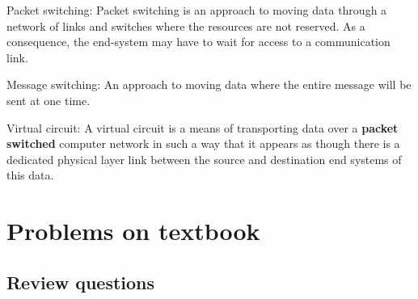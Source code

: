 \documentclass[]{article}
\begin{document}
\begin{enumerate}
\begin{adjustwidth}{0.1cm}{0cm}
		\qquad Packet switching: Packet switching is an approach to moving data through a network of links and switches where the resources are not reserved. As a consequence, the end-system may have to wait for access to a communication link.
		
		\qquad Message switching: An approach to moving data where the entire message will be sent at one time.
		
		\qquad Virtual circuit: A virtual circuit is a means of transporting data over a \textbf{packet switched} computer network in such a way that it appears as though there is a dedicated physical layer link between the source and destination end systems of this data. 
	\end{adjustwidth}
\end{enumerate}

\section{Problems on textbook}
\subsection{Review questions}
\end{document}
